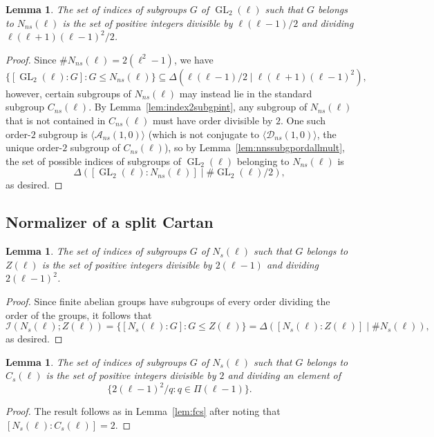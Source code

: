 \documentclass[table,dvipsnames]{amsart}
\newcommand{\GL}{\operatorname{GL}}
\newcommand{\I}{\mathcal{I}}
\newcommand{\angles}[1]{\langle #1\rangle}
\newtheorem{lemma}[theorem]{Lemma}
\numberwithin{equation}{section}
\newcommand{\s}{\textit{s}}
\newcommand{\ns}{\textit{ns}}
\newcommand{\Cs}{C_\s}
\newcommand{\Cns}{C_\ns}
\newcommand{\Ns}{N_\s}
\newcommand{\Nns}{N_\ns}
\begin{document}
\begin{lemma}
\label{lem:fnns}
The set of indices of subgroups $G$ of $\GL_2(\ell)$ such that $G$ belongs to $\Nns(\ell)$ is the set of positive integers divisible by $\ell(\ell-1)/2$ and dividing $\ell(\ell+1)(\ell-1)^2/2$.
\end{lemma}
\begin{proof}
Since $\#\Nns(\ell)=2(\ell^2-1)$, we have
\begin{equation*}
\{[\GL_2(\ell):G]:G\le\Nns(\ell)\}\subseteq\Delta(\ell(\ell-1)/2\mid\ell(\ell+1)(\ell-1)^2),
\end{equation*}
however, certain subgroups of $\Nns(\ell)$ may instead lie in the standard subgroup $\Cns(\ell)$. By Lemma~\ref{lem:index2subgpint}, any subgroup of $\Nns(\ell)$ that is not contained in $\Cns(\ell)$ must have order divisible by $2$. One such order-$2$ subgroup is $\angles{\mathcal{A}_\ns(1,0)}$ (which is not conjugate to $\angles{\mathcal{D}_\ns(1,0)}$, the unique order-$2$ subgroup of $\Cns(\ell)$), so by Lemma~\ref{lem:nnssubgpordallmult}, the set of possible indices of subgroups of $\GL_2(\ell)$ belonging to $\Nns(\ell)$ is
\begin{equation*}
\Delta([\GL_2(\ell):\Nns(\ell)]\mid\#\GL_2(\ell)/2),
\end{equation*}
as desired.
\end{proof}

\subsection{Normalizer of a split Cartan}
\label{subsec:s}

\begin{lemma}
\label{lem:sz}
The set of indices of subgroups $G$ of $\Ns(\ell)$ such that $G$ belongs to $Z(\ell)$ is the set of positive integers divisible by $2(\ell-1)$ and dividing $2(\ell-1)^2$.
\end{lemma}
\begin{proof}
Since finite abelian groups have subgroups of every order dividing the order of the groups, it follows that
\begin{equation*}
\I(\Ns(\ell);Z(\ell))=\{[\Ns(\ell):G]:G\le Z(\ell)\}=\Delta([\Ns(\ell):Z(\ell)]\mid\#\Ns(\ell)),
\end{equation*}
as desired.
\end{proof}

\begin{lemma}
\label{lem:scs}
The set of indices of subgroups $G$ of $\Ns(\ell)$ such that $G$ belongs to $\Cs(\ell)$ is the set of positive integers divisible by $2$ and dividing an element of
\begin{equation*}
\{2(\ell-1)^2/q:q\in\Pi(\ell-1)\}.
\end{equation*}
\end{lemma}
\begin{proof}
The result follows as in Lemma~\ref{lem:fcs} after noting that $[\Ns(\ell):\Cs(\ell)]=2$.
\end{proof}
\end{document}
